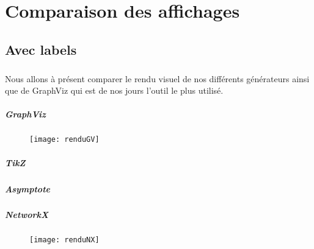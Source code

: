 \chapter{Comparaison des affichages}

	\section{Avec labels}
	
\paragraph{}Nous allons à présent comparer le rendu visuel de nos différents générateurs ainsi que de GraphViz qui est de nos jours l'outil le plus utilisé.
	
\paragraph{GraphViz}

\begin{figure}[h!]
\begin{center}
\texttt{[image: renduGV]}
\end{center}
\end{figure}

\paragraph{TikZ}

\begin{figure}[h!] \centering \resizebox {6cm}{10cm} {
}
\end{figure}

\paragraph{Asymptote}

\begin{figure}[h!]

\end{figure}

\paragraph{NetworkX}

\begin{figure}[h!]
\begin{center}
\texttt{[image: renduNX]}
\end{center}
\end{figure}
	
